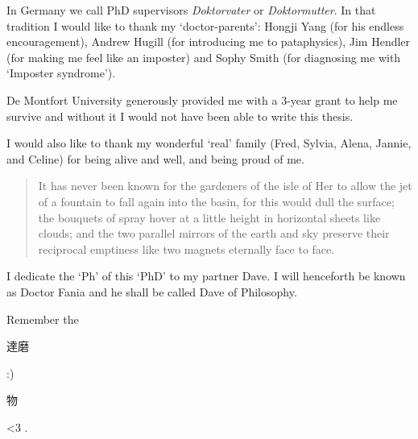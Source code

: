 
\pagestyle{fania}

\begin{wrapfigure}{L}{0.2\textwidth}
\end{wrapfigure}


In Germany we call PhD supervisors \textit{Doktorvater} or \textit{Doktormutter}. In that tradition I would like to thank my `doctor-parents': Hongji Yang (for his endless encouragement), Andrew Hugill (for introducing me to pataphysics), Jim Hendler (for making me feel like an imposter) and Sophy Smith (for diagnosing me with `Imposter syndrome').

De Montfort University generously provided me with a 3-year grant to help me survive and without it I would not have been able to write this thesis.

I would also like to thank my wonderful `real' family (Fred, Sylvia, Alena, Jannie, and Celine) for being alive and well, and being proud of me.


\spirals


\begin{quotation}
  It has never been known for the gardeners of the isle of Her to allow the jet of a fountain to fall again into the basin, for this would dull the surface; the bouquets of spray hover at a little height in horizontal sheets like clouds; and the two parallel mirrors of the earth and sky preserve their reciprocal emptiness like two magnets eternally face to face. 
\end{quotation}


\spirals


I dedicate the `Ph' of this `PhD' to my partner Dave. I will henceforth be known as Doctor Fania and he shall be called Dave of Philosophy. 

Remember the \begin{CJK}{UTF8}{min}達磨\end{CJK} :) \textipa{["h\ae pi} \begin{CJK}{UTF8}{min}物\end{CJK} \textipa{"v3:s@ri]} <3 . 


